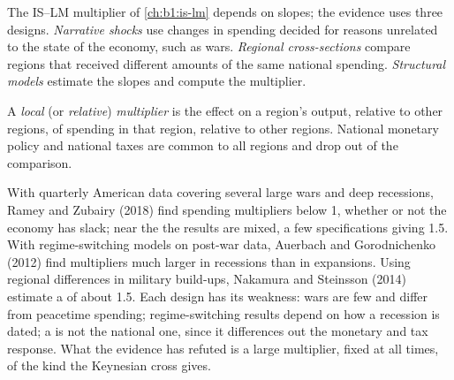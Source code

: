 The IS--LM multiplier of \cref{ch:b1:is-lm} depends on slopes; the
evidence uses three designs. \emph{Narrative shocks} use changes in
spending decided for reasons unrelated to the state of the economy, such
as wars. \emph{Regional cross-sections} compare regions that received
different amounts of the same national spending. \emph{Structural models}
estimate the slopes and compute the multiplier.

\begin{definition}\label{def:b1:stabilisation-policy:local-multiplier}
A \emph{local} (or \emph{relative}) \emph{multiplier} is the effect on a region's output,
relative to other regions, of spending in that region, relative to other
regions. National monetary policy and national taxes are common to all
regions and drop out of the comparison.
\end{definition}

\begin{debate}
With quarterly American data covering several large wars and deep
recessions, Ramey and Zubairy (2018) find spending multipliers below 1,
whether or not the economy has slack; near the  the
results are mixed, a few specifications giving 1.5. %
With regime-switching models on post-war data, Auerbach and Gorodnichenko
(2012) find multipliers much larger in recessions than in expansions.
Using regional differences in military build-ups, Nakamura and Steinsson
(2014) estimate a  of about 1.5. %
Each design has its weakness: wars are few and differ from peacetime
spending; regime-switching results depend on how a recession is dated;
a  is not the national one, since it differences out the
monetary and tax response. What the evidence has refuted is a large
multiplier, fixed at all times, of the kind the Keynesian cross gives.
\end{debate}


